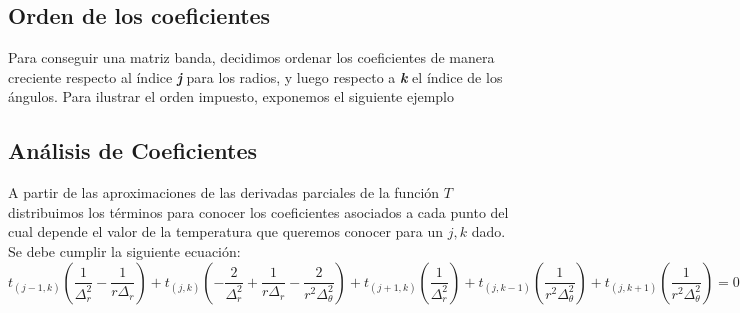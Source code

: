 \subsection{Orden de los coeficientes}

Para conseguir una matriz banda, decidimos ordenar los coeficientes de manera creciente respecto al índice \textbf{\textit{j}} para los radios, y luego respecto a \textbf{\textit{k}} el índice de los ángulos. Para ilustrar el orden impuesto, exponemos el siguiente ejemplo




\subsection{Análisis de Coeficientes}
A partir de las aproximaciones de las derivadas parciales de la función $T$ distribuimos los términos para conocer los coeficientes asociados a cada punto del cual depende el valor de la temperatura que queremos conocer para un $j,k$ dado. Se debe cumplir la siguiente ecuación: \\
$$t_{(j-1, k)} (\frac{1}{\Delta^2_r}-\frac{1}{r \Delta_r}) +
t_{(j, k)} (-\frac{2}{\Delta^2_r}+\frac{1}{r \Delta_r}-\frac{2}{r^2 \Delta^2_\theta}) + 
t_{(j+1, k)} (\frac{1}{\Delta^2_r}) + 
t_{(j, k-1)} (\frac{1}{r^2 \Delta^2_\theta}) +
t_{(j, k+1)} (\frac{1}{r^2 \Delta^2_\theta}) = 0 $$ \\


